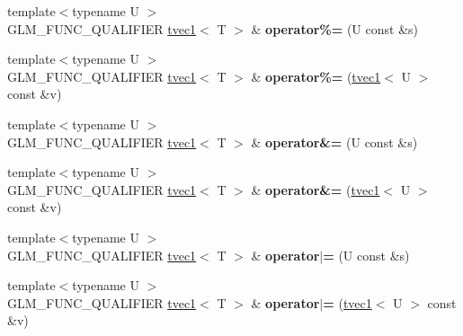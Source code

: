 \begin{DoxyCompactItemize}
\item 
\hypertarget{structglm_1_1detail_1_1tvec1_a9054b11d8059ccc1d388a0c6c2a8443c}{{\footnotesize template$<$typename U $>$ }\\G\-L\-M\-\_\-\-F\-U\-N\-C\-\_\-\-Q\-U\-A\-L\-I\-F\-I\-E\-R \hyperlink{structglm_1_1detail_1_1tvec1}{tvec1}$<$ T $>$ \& {\bfseries operator\%=} (U const \&s)}\label{structglm_1_1detail_1_1tvec1_a9054b11d8059ccc1d388a0c6c2a8443c}

\item 
\hypertarget{structglm_1_1detail_1_1tvec1_a3aa97cec6b84f307b81679b19ed37e70}{{\footnotesize template$<$typename U $>$ }\\G\-L\-M\-\_\-\-F\-U\-N\-C\-\_\-\-Q\-U\-A\-L\-I\-F\-I\-E\-R \hyperlink{structglm_1_1detail_1_1tvec1}{tvec1}$<$ T $>$ \& {\bfseries operator\%=} (\hyperlink{structglm_1_1detail_1_1tvec1}{tvec1}$<$ U $>$ const \&v)}\label{structglm_1_1detail_1_1tvec1_a3aa97cec6b84f307b81679b19ed37e70}

\item 
\hypertarget{structglm_1_1detail_1_1tvec1_ab81861a394d842d0801463785a373e77}{{\footnotesize template$<$typename U $>$ }\\G\-L\-M\-\_\-\-F\-U\-N\-C\-\_\-\-Q\-U\-A\-L\-I\-F\-I\-E\-R \hyperlink{structglm_1_1detail_1_1tvec1}{tvec1}$<$ T $>$ \& {\bfseries operator\&=} (U const \&s)}\label{structglm_1_1detail_1_1tvec1_ab81861a394d842d0801463785a373e77}

\item 
\hypertarget{structglm_1_1detail_1_1tvec1_aafbcfed9a10a7a73850adbff2395416a}{{\footnotesize template$<$typename U $>$ }\\G\-L\-M\-\_\-\-F\-U\-N\-C\-\_\-\-Q\-U\-A\-L\-I\-F\-I\-E\-R \hyperlink{structglm_1_1detail_1_1tvec1}{tvec1}$<$ T $>$ \& {\bfseries operator\&=} (\hyperlink{structglm_1_1detail_1_1tvec1}{tvec1}$<$ U $>$ const \&v)}\label{structglm_1_1detail_1_1tvec1_aafbcfed9a10a7a73850adbff2395416a}

\item 
\hypertarget{structglm_1_1detail_1_1tvec1_a07033352925336c5a38cfd7057f230fb}{{\footnotesize template$<$typename U $>$ }\\G\-L\-M\-\_\-\-F\-U\-N\-C\-\_\-\-Q\-U\-A\-L\-I\-F\-I\-E\-R \hyperlink{structglm_1_1detail_1_1tvec1}{tvec1}$<$ T $>$ \& {\bfseries operator$\vert$=} (U const \&s)}\label{structglm_1_1detail_1_1tvec1_a07033352925336c5a38cfd7057f230fb}

\item 
\hypertarget{structglm_1_1detail_1_1tvec1_a522b681892d89d7eea2d4173b90f9c71}{{\footnotesize template$<$typename U $>$ }\\G\-L\-M\-\_\-\-F\-U\-N\-C\-\_\-\-Q\-U\-A\-L\-I\-F\-I\-E\-R \hyperlink{structglm_1_1detail_1_1tvec1}{tvec1}$<$ T $>$ \& {\bfseries operator$\vert$=} (\hyperlink{structglm_1_1detail_1_1tvec1}{tvec1}$<$ U $>$ const \&v)}\label{structglm_1_1detail_1_1tvec1_a522b681892d89d7eea2d4173b90f9c71}


\end{DoxyCompactItemize}

